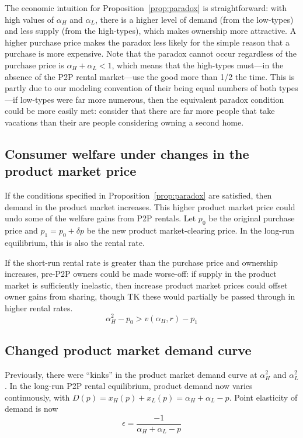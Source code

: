 \documentclass[11pt]{article}
\begin{document}
The economic intuition for Proposition~\ref{prop:paradox}  is straightforward: 
with high values of $\alpha_H$ and $\alpha_L$, there is a higher level of demand (from the low-types) and less supply (from the high-types), which makes ownership more attractive. 
A higher purchase price makes the paradox less likely for the simple reason that a purchase is more expensive. 
Note that the paradox cannot occur regardless of the purchase price is $\alpha_H + \alpha_L < 1$, which means that the high-types must---in the absence of the P2P rental market---use the good more than 1/2 the time. 
This is partly due to our modeling convention of their being equal numbers of both types---if low-types were far more numerous, then the equivalent paradox condition could be more easily met: 
consider that there are far more people that take vacations than their are people considering owning a second home.  

\subsection{Consumer welfare under changes in the product market price} 
If the conditions specified in Proposition~\ref{prop:paradox} are satisfied, then demand in the product market increases. 
This higher product market price could undo some of the welfare gains from P2P rentals. 
Let $p_0$ be the original purchase price and $p_1 = p_0 + \delta p$ be the new product market-clearing price. 
In the long-run equilibrium, this is also the rental rate. 
 

If the short-run rental rate is greater than the purchase price and ownership increases, pre-P2P owners could be made worse-off: if supply in the product market is sufficiently inelastic, then increase product market prices could offset owner gains from sharing, though TK these would partially be passed through in higher rental rates. 
\begin{equation}
\alpha_H^2 - p_0 > v(\alpha_H, r) - p_1 
\end{equation} 

\subsection{Changed product market demand curve} 
Previously, there were ``kinks'' in the product market demand curve at $\alpha_H^2$ and $\alpha_L^2$. 
In the long-run P2P rental equilibrium, product demand now varies continuously, with $D(p) = x_H(p) + x_L(p) = \alpha_H + \alpha_L - p$. 
Point elasticity of demand is now 
\begin{equation}
\epsilon = \frac{-1}{\alpha_H + \alpha_L - p} 
\end{equation} 
\end{document}
